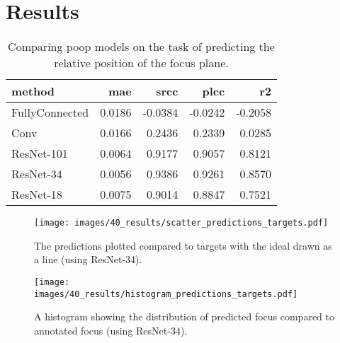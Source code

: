 \chapter{Results}
\label{ch:Results}



\begin{table}
    \centering
    \caption{Comparing \acs{poop} models on the task of predicting the relative position of the focus plane.}
    \begin{tabular}{|l|rrrr|}
        \hline
        method          & \acs{mae} & \acs{srcc} & \acs{plcc} & \acs{r2} \\
        \hline
        FullyConnected  & 0.0186 & -0.0384 & -0.0242 & -0.2058 \\
        Conv            & 0.0166 &  0.2436 &  0.2339 &  0.0285 \\
        ResNet-101      & 0.0064 &  0.9177 &  0.9057 &  0.8121 \\
        ResNet-34       & 0.0056 &  0.9386 &  0.9261 &  0.8570 \\
        ResNet-18       & 0.0075 &  0.9014 &  0.8847 &  0.7521 \\
        \hline
    \end{tabular}
    \label{tab:Results:Models:Accuracy}
\end{table}

\begin{figure}
    \centering
    \texttt{[image: images/40\_results/scatter\_predictions\_targets.pdf]}
    \caption{The predictions plotted compared to targets with the ideal drawn as a line (using ResNet-34).}
    \label{fig:Results:ScatterPredictedTarget}
\end{figure}
\begin{figure}
    \centering
    \texttt{[image: images/40\_results/histogram\_predictions\_targets.pdf]}
    \caption{A histogram showing the distribution of predicted focus compared to annotated focus (using ResNet-34).}
    \label{fig:Results:HistogramPredictedTarget}
\end{figure}

